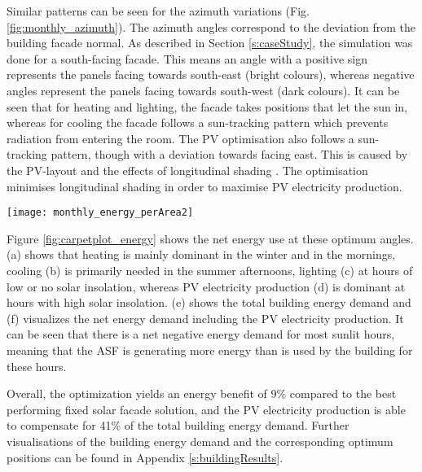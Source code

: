 	Similar patterns can be seen for the azimuth variations (Fig. \ref{fig:monthly_azimuth}). The azimuth angles correspond to the deviation from the building facade normal. As described in Section \ref{s:caseStudy}, the simulation was done for a south-facing facade. This means an angle with a positive sign represents the panels facing towards south-east (bright colours), whereas negative angles represent the panels facing towards south-west (dark colours). It can be seen that for heating and lighting, the facade takes positions that let the sun in, whereas for cooling the facade follows a sun-tracking pattern which prevents radiation from entering the room. The PV optimisation also follows a sun-tracking pattern, though with a deviation towards facing east. This is caused by the PV-layout and the effects of longitudinal shading \cite{hofer2016}. The optimisation minimises longitudinal shading in order to maximise PV electricity production. 

	\begin{figure*}[b!!]
		\begin{center}
		\texttt{[image: monthly\_energy\_perArea2]}
		\caption{Carpet plots detailing the net energy consumption. Each square represents the total energy consumption for that specific hour of the entire month. Red colours detail the energy demand, while blue colours detail the energy supply.}
		\label{fig:carpetplot_energy}
		\end{center}
	\end{figure*}

	Figure \ref{fig:carpetplot_energy} shows the net energy use at these optimum angles. (a) shows that heating is mainly dominant in the winter and in the mornings, cooling (b) is primarily needed in the summer afternoons, lighting (c) at hours of low or no solar insolation, whereas PV electricity production (d) is dominant at hours with high solar insolation. (e) shows the total building energy demand and (f) visualizes the net energy demand including the PV electricity production. It can be seen that there is a net negative energy demand for most sunlit hours, meaning that the ASF is generating more energy than is used by the building for these hours. 

	Overall, the optimization yields an energy benefit of 9\% compared to the best performing fixed solar facade solution, and the PV electricity production is able to compensate for 41\% of the total building energy demand. Further visualisations of the building energy demand and the corresponding optimum positions can be found in Appendix \ref{s:buildingResults}. 

